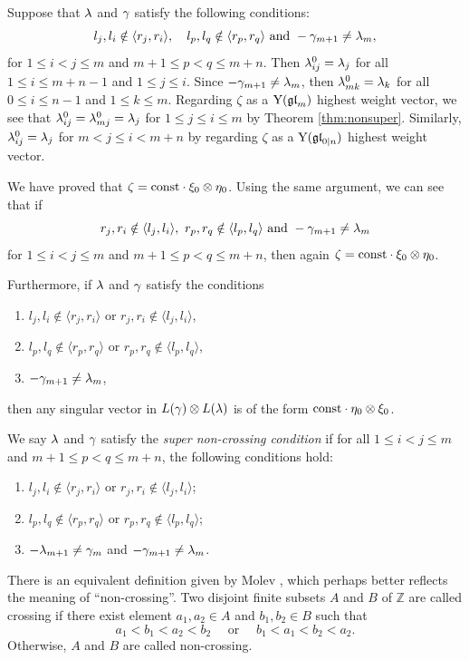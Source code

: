 \documentclass[12pt]{amsart}
\begin{document}
\ble\label{lem:la0}
Suppose that $\lambda$ and $\gamma$ satisfy the following conditions:
\[
l_j,l_i\notin \langle r_j,r_i\rangle,\quad l_p,l_q\notin\langle r_p,r_q\rangle \text{ and }-\gamma_{m+1}\neq \lambda_m,
\]
for $1\leq i<j\leq m$ and $m+1\leq p<q\leq m+n$.
Then $\lambda_{ij}^0=\lambda_j$ for all $1\leq i\leq m+n-1$ and $1\leq j\leq i$.
\ele
\bpf
Since $-\gamma_{m+1}\neq \lambda_m$, then $\lambda_{mk}^0=\lambda_k$ for all $0\leq i\leq n-1$ and $1\leq k\leq m$.
Regarding $\zeta$ as a ${\rm Y}(\mathfrak{gl}_m)$ highest weight vector,  we see that $\lambda^0_{ij}=\lambda_{mj}^0=\lambda_j$ for $1\leq j\leq i\leq m$ by  Theorem \ref{thm:nonsuper}.
Similarly,  $\lambda^0_{ij}=\lambda_j$ for $m<j\leq i<m+n$ by regarding $\zeta$ as a ${\rm Y}(\mathfrak{gl}_{0|n})$ highest weight vector.
\epf

We have proved that $\zeta=\text{const}\cdot\xi_0\otimes \eta_0$. Using the same argument, we can see that if
\[
r_j,r_i\notin \langle l_j,l_i\rangle,\ r_p,r_q\notin\langle l_p,l_q\rangle \text{ and } -\ga_{m+1}\neq \la_m
\]
for $1\leq i<j\leq m$ and $m+1\leq p<q\leq m+n$, then again $\zeta=\text{const}\cdot\xi_0\otimes \eta_0$.

Furthermore, if $\lambda$ and $\gamma$ satisfy the  conditions
\begin{enumerate}
\item $l_j,l_i\notin \langle r_j,r_i\rangle$ or $r_j,r_i\notin \langle l_j,l_i\rangle$,
\item $l_p,l_q\notin\langle r_p,r_q\rangle$ or $r_p,r_q\notin\langle l_p,l_q\rangle$,
\item $-\gamma_{m+1}\neq \lambda_m$,
\end{enumerate}
then any singular vector in $L(\gamma)\otimes L(\lambda)$ is of the form $\text{const}\cdot \eta_0\otimes \xi_0$.

\bde\label{def:noncro}
We say $\lambda$ and $\gamma$ satisfy the \emph{super non-crossing condition} if for all $1\leq i<j\leq m$ and $m+1\leq p<q\leq m+n$, the following conditions hold:
\begin{enumerate}
\item $l_j,l_i\notin \langle r_j,r_i\rangle$ or $r_j,r_i\notin \langle l_j,l_i\rangle$;
\item $l_p,l_q\notin\langle r_p,r_q\rangle$ or $r_p,r_q\notin\langle l_p,l_q\rangle$;
\item  $-\lambda_{m+1}\neq\gamma_m$ and $-\gamma_{m+1}\neq \lambda_m$.
\end{enumerate}
\ede

There is an equivalent definition given by Molev \cite{Mol 2002}, which perhaps better reflects the meaning of ``non-crossing''.
Two disjoint finite subsets $A$ and $B$ of $\mathbb{Z}$ are called crossing if there exist element $a_1,a_2\in A$ and $b_1,b_2\in B$ such that
\[
a_1<b_1<a_2<b_2\quad\text{ or }\quad b_1<a_1<b_2<a_2.
\]
Otherwise, $A$ and $B$ are called non-crossing.
\end{document}
